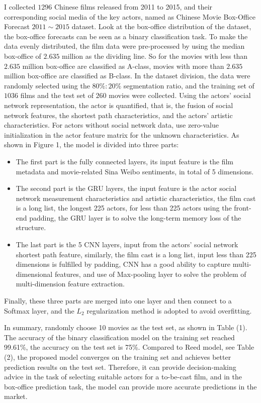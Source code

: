 \documentclass[review]{cvpr}
\begin{document}
I collected $1296$ Chinese films released from 2011 to 2015, and their corresponding social media of the key actors, named as Chinese Movie Box-Office Forecast $2011\sim2015$ dataset.
Look at the box-office distribution of the dataset, the box-office forecasts can be seen as a binary classification task.
To make the data evenly distributed, the film data were pre-processed by using the median box-office of $2.635$ million as the dividing line.
So for the movies with less than $2.635$ million box-office are classified as A-class, movies with more than $2.635$ million box-office are classified as B-class.
In the dataset division, the data were randomly selected using the $80\%:20\%$ segmentation ratio, and the training set of $1036$ films and the test set of $260$ movies were collected.
Using the actors' social network representation, the actor is quantified, that is,
the fusion of social network features, the shortest path characteristics, and the actors' artistic characteristics.
For actors without social network data, use zero-value initialization in the actor feature matrix for the unknown characteristics.
As shown in Figure 1, the model is divided into three parts:

\begin{itemize}
\item The first part is the fully connected layers, its input feature is the film metadata and movie-related Sina Weibo sentiments, in total of 5 dimensions.
\item The second part is the GRU layers, the input feature is the actor social network measurement characteristics and artistic characteristics, the film cast is a long list,
the longest 225 actors, for less than 225 actors using the front-end padding, the GRU layer is to solve the long-term memory loss of the structure.
\item The last part is the 5 CNN layers, input from the actors' social network shortest path feature, similarly, the film cast is a long list,
input less than 225 dimensions is fulfilled by padding, CNN has a good ability to capture multi-dimensional features, and use of Max-pooling layer to solve the problem of multi-dimension feature extraction.
\end{itemize}
Finally, these three parts are merged into one layer and then connect to a Softmax layer, and the $L_2$ regularization method is adopted to avoid overfitting.


In summary, randomly choose 10 movies as the test set, as shown in Table (1).
The accuracy of the binary classification model on the training set reached 99.61\%, the accuracy on the test set is 75\%.
Compared to Reed \etal model, see Table (2), the proposed model converges on the training set and achieves better prediction results on the test set.
Therefore, it can provide decision-making advice in the task of selecting suitable actors for a to-be-cast film,
and in the box-office prediction task, the model can provide more accurate predictions in the market.
\end{document}
